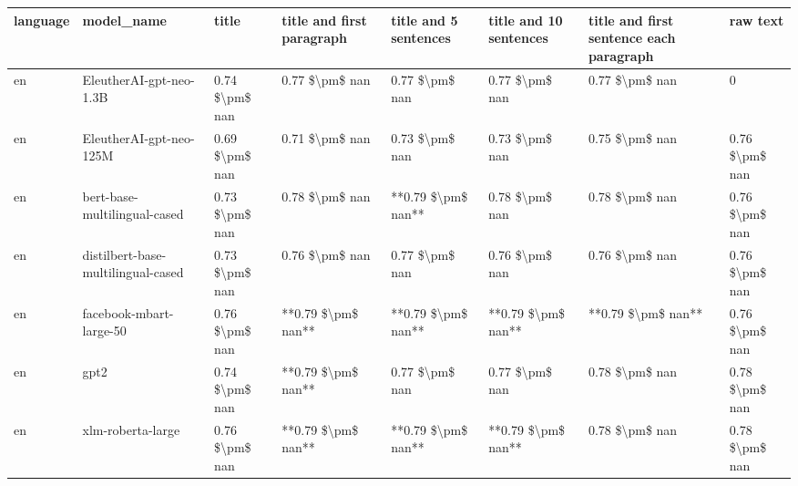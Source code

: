 \begin{tabular}{llllllll}
\toprule
language &                         model\_name &          title & title and first paragraph & title and 5 sentences & title and 10 sentences & title and first sentence each paragraph &           raw text \\
\midrule
      en &            EleutherAI-gpt-neo-1.3B & 0.74 \$\textbackslash pm\$ nan &            0.77 \$\textbackslash pm\$ nan &        0.77 \$\textbackslash pm\$ nan &         0.77 \$\textbackslash pm\$ nan &                          0.77 \$\textbackslash pm\$ nan &                  0 \\
      en &            EleutherAI-gpt-neo-125M & 0.69 \$\textbackslash pm\$ nan &            0.71 \$\textbackslash pm\$ nan &        0.73 \$\textbackslash pm\$ nan &         0.73 \$\textbackslash pm\$ nan &                          0.75 \$\textbackslash pm\$ nan &     0.76 \$\textbackslash pm\$ nan \\
      en &       bert-base-multilingual-cased & 0.73 \$\textbackslash pm\$ nan &            0.78 \$\textbackslash pm\$ nan &    **0.79 \$\textbackslash pm\$ nan** &         0.78 \$\textbackslash pm\$ nan &                          0.78 \$\textbackslash pm\$ nan &     0.76 \$\textbackslash pm\$ nan \\
      en & distilbert-base-multilingual-cased & 0.73 \$\textbackslash pm\$ nan &            0.76 \$\textbackslash pm\$ nan &        0.77 \$\textbackslash pm\$ nan &         0.76 \$\textbackslash pm\$ nan &                          0.76 \$\textbackslash pm\$ nan &     0.76 \$\textbackslash pm\$ nan \\
      en &            facebook-mbart-large-50 & 0.76 \$\textbackslash pm\$ nan &        **0.79 \$\textbackslash pm\$ nan** &    **0.79 \$\textbackslash pm\$ nan** &     **0.79 \$\textbackslash pm\$ nan** &                      **0.79 \$\textbackslash pm\$ nan** &     0.76 \$\textbackslash pm\$ nan \\
      en &                               gpt2 & 0.74 \$\textbackslash pm\$ nan &        **0.79 \$\textbackslash pm\$ nan** &        0.77 \$\textbackslash pm\$ nan &         0.77 \$\textbackslash pm\$ nan &                          0.78 \$\textbackslash pm\$ nan &     0.78 \$\textbackslash pm\$ nan \\
      en &                  xlm-roberta-large & 0.76 \$\textbackslash pm\$ nan &        **0.79 \$\textbackslash pm\$ nan** &    **0.79 \$\textbackslash pm\$ nan** &     **0.79 \$\textbackslash pm\$ nan** &                          0.78 \$\textbackslash pm\$ nan &     0.78 \$\textbackslash pm\$ nan \\

\end{tabular}
